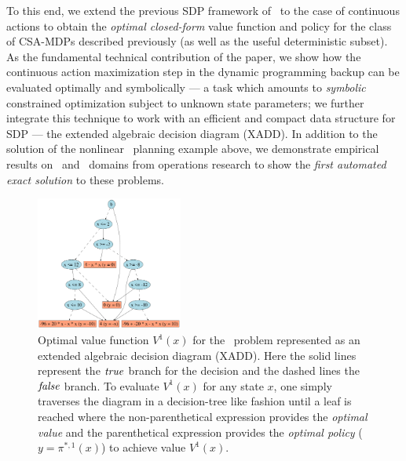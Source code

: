 To this end, we extend the previous SDP framework
of~\cite{sanner_uai11} to the case of continuous actions to obtain the
\emph{optimal closed-form} value function and policy for the
class of CSA-MDPs described previously (as well as the useful
deterministic subset).
As the fundamental technical contribution of the paper, we
show how the continuous action maximization step in the dynamic programming
backup can be evaluated optimally and symbolically --- a task which
amounts to \emph{symbolic} constrained optimization subject to
unknown state parameters; we further integrate this technique to work
with an efficient and compact data structure for SDP --- the extended
algebraic decision diagram (XADD).  
In addition to the solution of the nonlinear \MarsRover\
planning example above, we demonstrate empirical results on
\WaterReservoir\ and \InventoryControl\ domains from operations research
to show the \emph{first automated exact solution} to these problems.

\begin{figure}[t!]
\hspace{-1mm}\includegraphics[width=0.43\textwidth]{Figures1/v2_mr_dd.pdf}
\vspace{-1mm}
\caption{\footnotesize Optimal value function $V^1(x)$ for the
\MarsRover\ problem represented as an extended algebraic decision
diagram (XADD).  Here the solid lines represent the $\mathit{true}$ branch for
the decision and the dashed lines the $\mathit{false}$ branch.  To evaluate
$V^1(x)$ for any state $x$, one simply traverses the diagram in a
decision-tree like fashion until a leaf is reached where the
non-parenthetical expression provides the \emph{optimal value} and the
parenthetical expression provides the \emph{optimal policy} 
($y = \pi^{*,1}(x)$) to achieve value $V^1(x)$.}
\label{fig:opt_val_pol}
\vspace{-3mm}
\end{figure}
